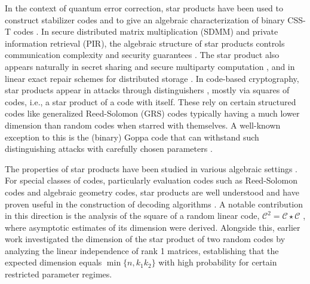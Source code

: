\documentclass[a4paper,11pt,reqno]{article}
\theoremstyle{plain} \numberwithin{equation}{section}
\theoremstyle{definition}
\begin{document}
In the context of quantum error correction, star products have been used to construct stabilizer codes \cite{CSST,rengaswamy2020optimality,bodur2025schur} and to give an algebraic characterization of binary CSS-T codes \cite{camps2023algebraic}. In secure distributed matrix multiplication (SDMM) and private information retrieval (PIR), the algebraic structure of star products controls communication complexity and security guarantees \cite{PIR2017,SDMM2024}. The star product also appears naturally in secret sharing and secure multiparty computation \cite{Cramer1,MPC}, and  in linear exact repair schemes for distributed storage \cite{guruswamiwooters,matthewsrepair}. In code-based cryptography, star products appear in attacks through distinguishers \cite{10.1007/s10623-014-9967-z,Hormann2023Distinguishing,Mora2022dual}, mostly via squares of codes, i.e., a star product of a code with itself. These rely on certain structured codes like generalized Reed-Solomon (GRS) codes  typically having a much lower dimension than random codes when starred with themselves.  A well-known exception to this is the (binary) Goppa code that can withstand such distinguishing attacks with carefully chosen parameters \cite{Mora2022dual}.

The properties of star products have been studied in various algebraic settings \cite{randriambololona:hal-02287120}. For special classes of codes, particularly evaluation codes such as Reed-Solomon codes and algebraic geometry codes, star products are well understood and have proven useful in the construction of decoding algorithms \cite{PELLIKAAN1996229,7942048}. A notable contribution in this direction is the analysis of the square of a random linear code, $\mathcal{C}^2 = \mathcal{C} \star \mathcal{C}$ \cite{cascudo2015squares}, where asymptotic estimates of its dimension were derived. Alongside this, earlier work \cite{7282444} investigated the dimension of the star product of two random codes by analyzing the linear independence of rank 1 matrices, establishing that the expected dimension equals $\min\{n, k_1k_2\}$ with high probability for certain restricted parameter regimes.
\end{document}
